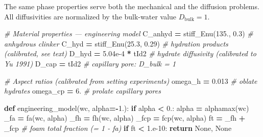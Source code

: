 \documentclass[
  a4paper,
  numbers=noendperiod,
  DIV=12]{scrreprt}
\newenvironment{Shaded}{\begin{snugshade}}{\end{snugshade}}
\newcommand{\CommentTok}[1]{\textcolor[rgb]{0.56,0.35,0.01}{\textit{#1}}}
\newcommand{\ControlFlowTok}[1]{\textcolor[rgb]{0.13,0.29,0.53}{\textbf{#1}}}
\newcommand{\FloatTok}[1]{\textcolor[rgb]{0.00,0.00,0.81}{#1}}
\newcommand{\KeywordTok}[1]{\textcolor[rgb]{0.13,0.29,0.53}{\textbf{#1}}}
\newcommand{\NormalTok}[1]{#1}
\newcommand{\OperatorTok}[1]{\textcolor[rgb]{0.81,0.36,0.00}{\textbf{#1}}}
\newcommand{\VariableTok}[1]{\textcolor[rgb]{0.00,0.00,0.00}{#1}}
\begin{document}
The same phase properties serve both the mechanical and the diffusion
problems. All diffusivities are normalized by the bulk-water value
\(D_\text{bulk}=1\).

\begin{Shaded}
\begin{Highlighting}[]
\CommentTok{\# Material properties — engineering model}
\NormalTok{C\_anhyd }\OperatorTok{=}\NormalTok{ stiff\_Enu(}\FloatTok{135.}\NormalTok{, }\FloatTok{0.3}\NormalTok{)    }\CommentTok{\# anhydrous clinker}
\NormalTok{C\_hyd   }\OperatorTok{=}\NormalTok{ stiff\_Enu(}\FloatTok{25.3}\NormalTok{, }\FloatTok{0.29}\NormalTok{)   }\CommentTok{\# hydration products (calibrated, see text)}
\NormalTok{D\_hyd   }\OperatorTok{=} \FloatTok{5.04e{-}4} \OperatorTok{*}\NormalTok{ tId2          }\CommentTok{\# hydrate diffusivity (calibrated to Yu 1991)}
\NormalTok{D\_cap   }\OperatorTok{=}\NormalTok{ tId2                    }\CommentTok{\# capillary pore: D\_bulk = 1}

\CommentTok{\# Aspect ratios (calibrated from setting experiments)}
\NormalTok{omega\_h  }\OperatorTok{=} \FloatTok{0.013}   \CommentTok{\# oblate hydrates}
\NormalTok{omega\_cp }\OperatorTok{=} \FloatTok{6.}      \CommentTok{\# prolate capillary pores}

\KeywordTok{def}\NormalTok{ engineering\_model(wc, alpha}\OperatorTok{={-}}\FloatTok{1.}\NormalTok{):}
    \ControlFlowTok{if}\NormalTok{ alpha }\OperatorTok{\textless{}} \FloatTok{0.}\NormalTok{: alpha }\OperatorTok{=}\NormalTok{ alphamax(wc)}
\NormalTok{    \_fa  }\OperatorTok{=}\NormalTok{ fa(wc, alpha)}
\NormalTok{    \_fh  }\OperatorTok{=}\NormalTok{ fh(wc, alpha)}
\NormalTok{    \_fcp }\OperatorTok{=}\NormalTok{ fcp(wc, alpha)}
\NormalTok{    ft   }\OperatorTok{=}\NormalTok{ \_fh }\OperatorTok{+}\NormalTok{ \_fcp            }\CommentTok{\# foam total fraction (= 1 {-} fa)}
    \ControlFlowTok{if}\NormalTok{ ft }\OperatorTok{\textless{}} \FloatTok{1.e{-}10}\NormalTok{: }\ControlFlowTok{return} \VariableTok{None}\NormalTok{, }\VariableTok{None}


\end{Highlighting}
\end{Shaded}
\end{document}
